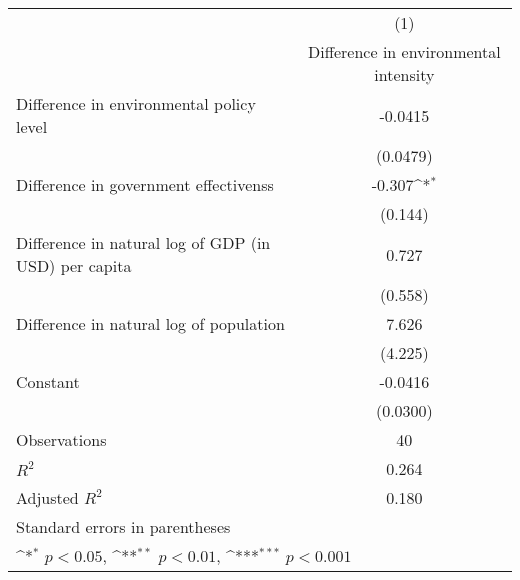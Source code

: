 {
\def\sym#1{\ifmmode^{#1}\else\(^{#1}\)\fi}
\begin{tabular}{l*{1}{c}}
\hline\hline
                    &\multicolumn{1}{c}{(1)}\\
                    &\multicolumn{1}{c}{Difference in environmental intensity}\\
\hline
Difference in environmental policy level&     -0.0415         \\
                    &    (0.0479)         \\
[1em]
Difference in government effectivenss&      -0.307\sym{*}  \\
                    &     (0.144)         \\
[1em]
Difference in natural log of GDP (in USD) per capita&       0.727         \\
                    &     (0.558)         \\
[1em]
Difference in natural log of population&       7.626         \\
                    &     (4.225)         \\
[1em]
Constant            &     -0.0416         \\
                    &    (0.0300)         \\
\hline
Observations        &          40         \\
\(R^{2}\)           &       0.264         \\
Adjusted \(R^{2}\)  &       0.180         \\
\hline\hline
\multicolumn{2}{l}{\footnotesize Standard errors in parentheses}\\
\multicolumn{2}{l}{\footnotesize \sym{*} \(p<0.05\), \sym{**} \(p<0.01\), \sym{***} \(p<0.001\)}\\
\end{tabular}
}
